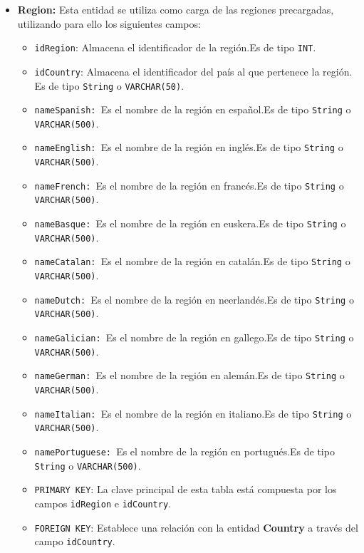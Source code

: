 \begin{itemize}
    \item \textbf{Region: }Esta entidad se utiliza como carga de las regiones precargadas, utilizando para ello los siguientes campos:
    \begin{itemize}
      \item \texttt{idRegion}: Almacena el identificador de la región.Es de tipo \texttt{INT}.
      \item \texttt{idCountry}: Almacena el identificador del país al que pertenece la región. Es de tipo \texttt{String} o \texttt{VARCHAR(50)}.
      \item \texttt{nameSpanish: }Es el nombre de la región en español.Es de tipo \texttt{String} o \texttt{VARCHAR(500)}.
        \item \texttt{nameEnglish: }Es el nombre de la región en inglés.Es de tipo \texttt{String} o \texttt{VARCHAR(500)}.
        \item \texttt{nameFrench: }Es el nombre de la región en francés.Es de tipo \texttt{String} o \texttt{VARCHAR(500)}.
        \item \texttt{nameBasque: }Es el nombre de la región en euskera.Es de tipo \texttt{String} o \texttt{VARCHAR(500)}.
        \item \texttt{nameCatalan: }Es el nombre de la región en catalán.Es de tipo \texttt{String} o \texttt{VARCHAR(500)}.
        \item \texttt{nameDutch: }Es el nombre de la región en neerlandés.Es de tipo \texttt{String} o \texttt{VARCHAR(500)}.
        \item \texttt{nameGalician: }Es el nombre de la región en gallego.Es de tipo \texttt{String} o \texttt{VARCHAR(500)}.
        \item \texttt{nameGerman: }Es el nombre de la región en alemán.Es de tipo \texttt{String} o \texttt{VARCHAR(500)}.
        \item \texttt{nameItalian: }Es el nombre de la región en italiano.Es de tipo \texttt{String} o \texttt{VARCHAR(500)}.
        \item \texttt{namePortuguese: }Es el nombre de la región en portugués.Es de tipo \texttt{String} o \texttt{VARCHAR(500)}.       
        \item \texttt{PRIMARY KEY}: La clave principal de esta tabla está compuesta por los campos \texttt{idRegion} e \texttt{idCountry}.
      \item \texttt{FOREIGN KEY}: Establece una relación con la entidad \textbf{Country} a través del campo \texttt{idCountry}.
    \end{itemize}


\end{itemize}
